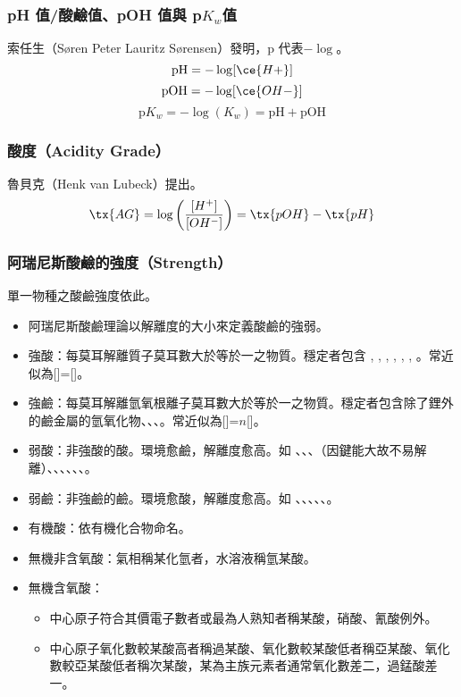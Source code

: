 \documentclass[a4paper,12pt]{article}
\begin{document}
\subsubsection{pH 值/酸鹼值、pOH 值與 p$K_w$值}
索任生（Søren Peter Lauritz Sørensen）發明，p 代表$-\log$。
\[\text{pH}=-\log[\ce{H+}]\]
\[\text{pOH}=-\log[\ce{OH-}]\]
\[\text{p}K_w=-\log(K_w)=\text{pH}+\text{pOH}\]
\subsubsection{酸度（Acidity Grade）}
魯貝克（Henk van Lubeck）提出。
\[\tx{AG}=\log\left(\frac{[H^+]}{[OH^-]}\right)=\tx{pOH}-\tx{pH}\]
\subsubsection{阿瑞尼斯酸鹼的強度（Strength）}
單一物種之酸鹼強度依此。
\begin{itemize}
\item 阿瑞尼斯酸鹼理論以解離度的大小來定義酸鹼的強弱。
\item 強酸：每莫耳解離質子莫耳數大於等於一之物質。穩定者包含 , , , , , , 。常近似為[]=[]。
\item 強鹼：每莫耳解離氫氧根離子莫耳數大於等於一之物質。穩定者包含除了鋰外的鹼金屬的氫氧化物、、、。常近似為[]=$n$[]。
\item 弱酸：非強酸的酸。環境愈鹼，解離度愈高。如 、、、（因鍵能大故不易解離）、、、、、、。
\item 弱鹼：非強鹼的鹼。環境愈酸，解離度愈高。如 、、、、、。
\end{itemize}
\begin{itemize}
\item 有機酸：依有機化合物命名。
\item 無機非含氧酸：氣相稱某化氫者，水溶液稱氫某酸。
\item 無機含氧酸：
\begin{itemize}
\item 中心原子符合其價電子數者或最為人熟知者稱某酸，硝酸、氰酸例外。
\item 中心原子氧化數較某酸高者稱過某酸、氧化數較某酸低者稱亞某酸、氧化數較亞某酸低者稱次某酸，某為主族元素者通常氧化數差二，過錳酸差一。
\end{itemize}
\end{itemize}
\end{document}
